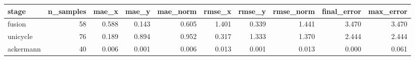 \begin{tabular}{lrrrrrrrrr}
\hline
stage & n\_samples & mae\_x & mae\_y & mae\_norm & rmse\_x & rmse\_y & rmse\_norm & final\_error & max\_error \\
\hline
fusion & 58 & 0.588 & 0.143 & 0.605 & 1.401 & 0.339 & 1.441 & 3.470 & 3.470 \\
unicycle & 76 & 0.189 & 0.894 & 0.952 & 0.317 & 1.333 & 1.370 & 2.444 & 2.444 \\
ackermann & 40 & 0.006 & 0.001 & 0.006 & 0.013 & 0.001 & 0.013 & 0.000 & 0.061 \\
\hline
\end{tabular}